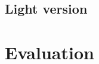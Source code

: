 \documentclass[11pt]{article}
\begin{document}
\subsection{Light version}

\section{Evaluation}

\clearpage

%
\end{document}
